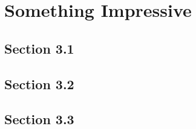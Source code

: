 

\chapter{Something Impressive}\label{chap:4}

\lipsum[1] %

\section{Section 3.1}\label{section4.1}

\lipsum[1-2]

\section{Section 3.2}\label{section4.2}

\lipsum[1-2]

\section{Section 3.3}\label{section4.3}

\lipsum[1-2]
